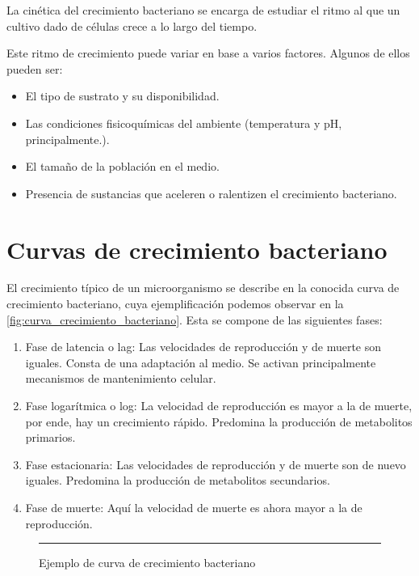 
La cinética del crecimiento bacteriano se encarga de estudiar el ritmo al que un cultivo dado de células crece a lo largo del tiempo.

Este ritmo de crecimiento puede variar en base a varios factores. Algunos de ellos pueden ser:

\begin{itemize}
    \item El tipo de sustrato y su disponibilidad.
    \item Las condiciones fisicoquímicas del ambiente (temperatura y pH, principalmente.).
    \item El tamaño de la población en el medio.
    \item Presencia de sustancias que aceleren o ralentizen el crecimiento bacteriano.
\end{itemize} 

\section{Curvas de crecimiento bacteriano}

El crecimiento típico de un microorganismo se describe en la conocida curva de crecimiento bacteriano, cuya ejemplificación podemos observar en la \autoref{fig:curva_crecimiento_bacteriano}. Esta se compone de las siguientes fases:

\begin{enumerate}
    \item Fase de latencia o lag: Las velocidades de reproducción y de muerte son iguales. Consta de una adaptación al medio. Se activan principalmente mecanismos de mantenimiento celular.
    \item Fase logarítmica o log: La velocidad de reproducción es mayor a la de muerte, por ende, hay un crecimiento rápido. Predomina la producción de metabolitos primarios.
    \item Fase estacionaria: Las velocidades de reproducción y de muerte son de nuevo iguales. Predomina la producción de metabolitos secundarios.
    \item Fase de muerte: Aquí la velocidad de muerte es ahora mayor a la de reproducción.
\end{enumerate}

\begin{figure}\centering
    \resizebox{\linewidth}{!}{}
    \rule{\linewidth}{0.5pt}
    \caption{Ejemplo de curva de crecimiento bacteriano}
    \label{fig:curva_crecimiento_bacteriano}
\end{figure}

